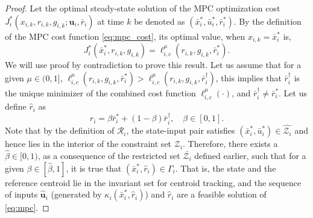 \begin{proof}
Let the optimal steady-state solution of the MPC optimization cost $J_i^*(x_{i,k}, r_{i,k}, g_{i,k}; \mathbf{u}_i, \bar{r}_i)$ at time $k$ be denoted as $(\bar{x}_i^*, \bar{u}_i^*, \bar{r}_i^*)$. By the definition of the MPC cost function \eqref{eq:mpc_cost}, its optimal value, when $x_{i,k} = \bar{x}_i^*$ is, 
\begin{equation}
    J_i^*(\bar{x}_{i}^*, r_{i,k}, g_{i,k}) =\ell_{i,c}^\mu(r_{i,k},g_{i,k},\bar{r}_i^*).
\end{equation}
We will use proof by contradiction to prove this result. Let us assume that for a given $\mu \in (0, 1 ]$, $\ell_{i,c}^\mu(r_{i,k},g_{i,k},\bar{r}_i^*) > \ell_{i,c}^\mu(r_{i,k},g_{i,k},\bar{r}_i^\dagger)$, this implies that $\bar{r}_i^\dagger$ is the unique minimizer of the combined cost function $\ell_{i,c}^\mu(\cdot)$, and $\bar{r}_i^\dagger\neq \bar{r}_i^*$.
Let us define $\hat{r}_i$ as
\begin{equation}
\label{eq:convex_set_ref}
    \hat{r}_i = \beta \bar{r}_i^* + (1-\beta)\bar{r}_i^\dagger, \quad \beta \in [0,1].
\end{equation}
Note that by the definition of $\mathcal{R}_i$, the state-input pair satisfies $(\bar{x}_i^*, \bar{u}_i^*) \in \hat{\mathcal{Z}_i}$ and hence lies in the interior of the constraint set $\mathcal{Z}_i$.
Therefore, there exists a $\hat{\beta} \in [0,1)$, as a consequence of the restricted set $\bar{\mathcal{Z}_i}$ defined earlier, such that for a given $\beta \in [\hat{\beta}, 1]$, it is true that $(\bar{x}^*_{i}, \hat{r}_i) \in \Gamma_i$. That is, the state and the reference centroid lie in the invariant set for centroid tracking, and the sequence of inputs $\hat{\mathbf{u}}_i$ (generated by $\kappa_i(\bar{x}^*_{i}, \hat{r}_i)$) and $\hat{r}_i$ are a feasible solution of \eqref{eq:mpc}. 


\end{proof}
